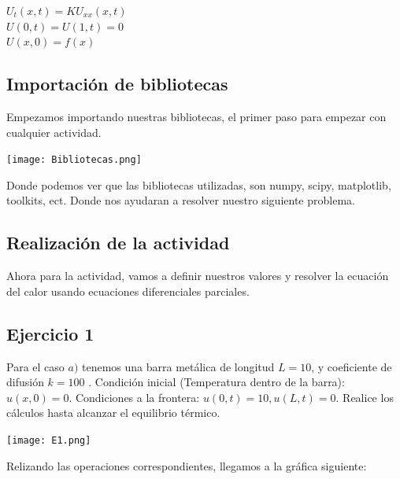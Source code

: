 \documentclass[12pt]{article}
\begin{document}
\begin{center}
    $U_{t}(x,t) = KU_{xx}(x,t)$\\
    $U(0,t) = U(1,t) = 0$\\
    $U(x,0) = f(x)$\\
\end{center}




\subsection*{Importación de bibliotecas}
Empezamos importando nuestras bibliotecas, el primer paso para empezar con cualquier actividad.

\begin{center}
    \texttt{[image: Bibliotecas.png]}
\end{center}
 
 Donde podemos ver que las bibliotecas utilizadas, son numpy, scipy, matplotlib, toolkits, ect. Donde nos ayudaran a resolver nuestro siguiente problema.




\subsection*{Realización de la actividad}
Ahora para la actividad, vamos a definir nuestros valores y resolver la ecuación del calor usando ecuaciones diferenciales parciales.


 



\subsection*{Ejercicio 1}

Para el caso $a)$ tenemos una barra metálica de longitud $L = 10$, y coeficiente de difusión  $k = 100$ . Condición inicial (Temperatura dentro de la barra): $u(x,0) = 0$. Condiciones a la frontera: $u(0,t) = 10, u(L,t) = 0$. Realice los cálculos hasta alcanzar el equilibrio térmico.

\begin{center}
    \texttt{[image: E1.png]}
\end{center}

Relizando las operaciones correspondientes, llegamos a la gráfica siguiente:
\end{document}
